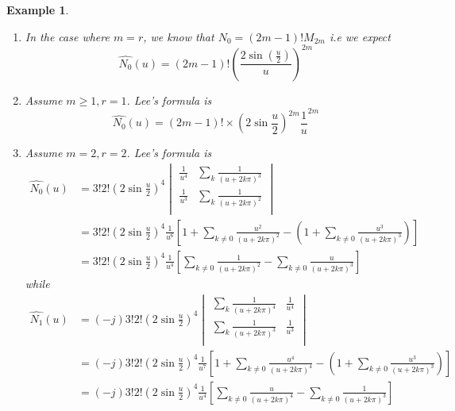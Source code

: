 \documentclass[a4paper, 11pt]{article}
\newtheorem{example}{Example}
\begin{document}
\begin{example}
  \begin{enumerate}
    \item In the case where $m=r$, we know that $N_0 = (2m-1)! M_{2m}$ i.e we expect \begin{equation}
	\hat{N_0}(u) = (2m-1)!{\left(\frac{2\sin(\frac{u}{2})}{u}\right)}^{2m}
      \end{equation}

    \item Assume $m \geq 1, r=1$. Lee's formula is
      \begin{equation}
	\hat{N_0}(u) = (2m-1)! \times {\left(2 \sin \frac{u}{2} \right)}^{2m} \frac{1}{u}^{2m} 
      \end{equation}

    \item Assume $m=2, r=2$. Lee's formula is 
      \begin{align*}
	\hat{N_0}(u) &= 3!2! {\left(2 \sin \frac{u}{2} \right)}^{4}   
	\begin{vmatrix}
	  \frac{1}{u^4} & \sum_{k} \frac{1}{{(u+2k\pi)}^{3}} \\
	  \frac{1}{u^3} & \sum_{k} \frac{1}{{(u+2k\pi)}^{2}} \\
	\end{vmatrix} \\
      &=  3!2! {\left(2 \sin \frac{u}{2} \right)}^{4}  \frac{1}{u^6} \left[ 1+ \sum_{k \neq 0} 
      \frac{u^2}{{(u+2k\pi)}^{2}} - (1+ \sum_{k \neq 0} \frac{u^3}{{(u+2k\pi)}^{3}})  \right] \\
      &=  3!2! {\left(2 \sin \frac{u}{2} \right)}^{4}  \frac{1}{u^4} \left[\sum_{k \neq 0} \frac{1}{{(u+2k\pi)}^{2}} - 
      \sum_{k \neq 0} \frac{u}{{(u+2k\pi)}^{3}} \right]
      \end{align*}
      while
      \begin{align*}
	\hat{N_1}(u) &= (-j) 3!2! {\left(2 \sin \frac{u}{2} \right)}^{4}   \begin{vmatrix}
	  \sum_{k} \frac{1}{{(u+2k\pi)}^{4}} & \frac{1}{u^4}  \\
	  \sum_{k} \frac{1}{{(u+2k\pi)}^{3}} & \frac{1}{u^3} \\
	\end{vmatrix} \\
	&= (-j) 3!2! {\left(2 \sin \frac{u}{2} \right)}^{4}  \frac{1}{u^7} \left[ 1+ \sum_{k \neq 0} 
	\frac{u^4}{{(u+2k\pi)}^{4}} - (1+ \sum_{k \neq 0} \frac{u^3}{{(u+2k\pi)}^{3}})  \right] \\
	&= (-j) 3!2! {\left(2 \sin \frac{u}{2} \right)}^{4}  \frac{1}{u^4} \left[\sum_{k \neq 0} 
	\frac{u}{{(u+2k\pi)}^{4}} - \sum_{k \neq 0} \frac{1}{{(u+2k\pi)}^{3}} \right]
      \end{align*}


\end{enumerate}
\end{example}
\end{document}
